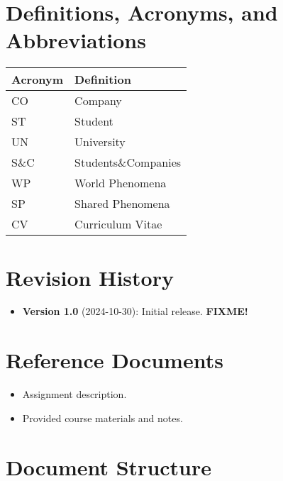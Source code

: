 \section{Definitions, Acronyms, and Abbreviations}
\label{sec:definitions-acronyms-abbreviations}%

\begin{longtable}{|l|p{}|}
    \hline
    \textbf{Acronym} & \textbf{Definition} \\
    \hline \hline
    CO               & Company             \\
    \hline
    ST               & Student             \\
    \hline
    UN               & University          \\
    \hline
    S\&C             & Students\&Companies \\
    \hline
    WP               & World Phenomena     \\
    \hline
    SP               & Shared Phenomena    \\
    \hline
    CV               & Curriculum Vitae    \\
    \hline
\end{longtable}

\section{Revision History}
\label{sec:revision-history}%

\begin{itemize}
    \item \textbf{Version 1.0} (2024-10-30): Initial release. \textbf{FIXME!}
\end{itemize}

\section{Reference Documents}
\label{sec:reference-documents}%

\begin{itemize}
    \item Assignment description.
    \item Provided course materials and notes.
\end{itemize}

\section{Document Structure}
\label{sec:document-structure}%

